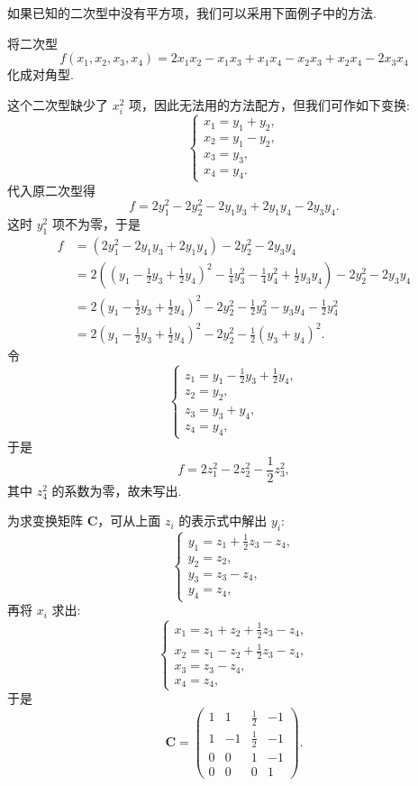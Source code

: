 \documentclass[../../main.tex]{subfiles}%
\begin{document}
如果已知的二次型中没有平方项，我们可以采用下面例子中的方法.
\begin{example}
将二次型
\[
f(x_1,x_2,x_3,x_4)=2x_1x_2 - x_1x_3 + x_1x_4 - x_2x_3 + x_2x_4 - 2x_3x_4
\]
化成对角型.
\end{example}
\begin{solution}

这个二次型缺少了 $x_i^2$ 项，因此无法用的方法配方，但我们可作如下变换:
\[
\begin{cases}
x_1 = y_1 + y_2,\\
x_2 = y_1 - y_2,\\
x_3 = y_3,\\
x_4 = y_4.
\end{cases}
\]
代入原二次型得
\[
f = 2y_1^2 - 2y_2^2 - 2y_1y_3 + 2y_1y_4 - 2y_3y_4.
\]
这时 $y_1^2$ 项不为零，于是
\begin{align*}
f&=(2y_1^2 - 2y_1y_3 + 2y_1y_4) - 2y_2^2 - 2y_3y_4\\
&=2\left((y_1 - \frac{1}{2}y_3 + \frac{1}{2}y_4)^2 - \frac{1}{4}y_3^2 - \frac{1}{4}y_4^2 + \frac{1}{2}y_3y_4\right) - 2y_2^2 - 2y_3y_4\\
&=2(y_1 - \frac{1}{2}y_3 + \frac{1}{2}y_4)^2 - 2y_2^2 - \frac{1}{2}y_3^2 - y_3y_4 - \frac{1}{2}y_4^2\\
&=2(y_1 - \frac{1}{2}y_3 + \frac{1}{2}y_4)^2 - 2y_2^2 - \frac{1}{2}(y_3 + y_4)^2.
\end{align*}
令
\[
\begin{cases}
z_1 = y_1 - \frac{1}{2}y_3 + \frac{1}{2}y_4,\\
z_2 = y_2,\\
z_3 = y_3 + y_4,\\
z_4 = y_4,
\end{cases}
\]
于是
\[
f = 2z_1^2 - 2z_2^2 - \frac{1}{2}z_3^2,
\]
其中 $z_4^2$ 的系数为零，故未写出.

为求变换矩阵 $\boldsymbol{C}$，可从上面 $z_i$ 的表示式中解出 $y_i$:
\[
\begin{cases}
y_1 = z_1 + \frac{1}{2}z_3 - z_4,\\
y_2 = z_2,\\
y_3 = z_3 - z_4,\\
y_4 = z_4,
\end{cases}
\]
再将 $x_i$ 求出:
\[
\begin{cases}
x_1 = z_1 + z_2 + \frac{1}{2}z_3 - z_4,\\
x_2 = z_1 - z_2 + \frac{1}{2}z_3 - z_4,\\
x_3 = z_3 - z_4,\\
x_4 = z_4,
\end{cases}
\]
于是
\[
\boldsymbol{C}=
\begin{pmatrix}
1 & 1 & \frac{1}{2} & -1\\
1 & -1 & \frac{1}{2} & -1\\
0 & 0 & 1 & -1\\
0 & 0 & 0 & 1
\end{pmatrix}.
\] 

\end{solution}
\end{document}
